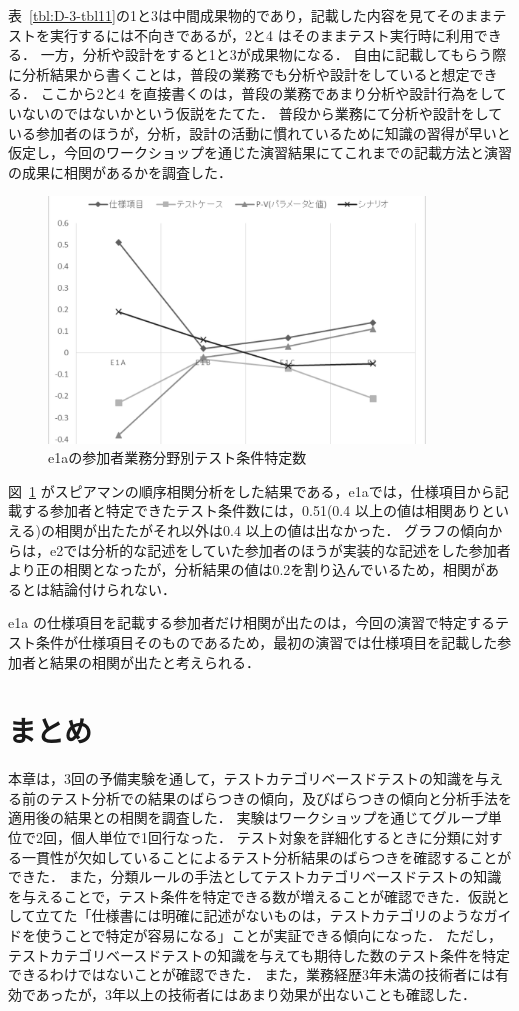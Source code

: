 表~\ref{tbl:D-3-tbl11}の1と3は中間成果物的であり，記載した内容を見てそのままテストを実行するには不向きであるが，2と4 はそのままテスト実行時に利用できる．
一方，分析や設計をすると1と3が成果物になる．
自由に記載してもらう際に分析結果から書くことは，普段の業務でも分析や設計をしていると想定できる．
ここから2と4 を直接書くのは，普段の業務であまり分析や設計行為をしていないのではないかという仮説をたてた．
普段から業務にて分析や設計をしている参加者のほうが，分析，設計の活動に慣れているために知識の習得が早いと仮定し，今回のワークショップを通じた演習結果にてこれまでの記載方法と演習の成果に相関があるかを調査した．

\begin{figure}[h]
  \begin{center}
  \includegraphics[width=10cm]{./image/D-3-Fig13.png}
  \caption{e1aの参加者業務分野別テスト条件特定数}
  \label{fig:D-3-Fig13}
  \end{center}
\end{figure}

図~\ref{fig:D-3-Fig13} がスピアマンの順序相関分析をした結果である，e1aでは，仕様項目から記載する参加者と特定できたテスト条件数には，0.51(0.4 以上の値は相関ありといえる)の相関が出たたがそれ以外は0.4 以上の値は出なかった．
グラフの傾向からは，e2では分析的な記述をしていた参加者のほうが実装的な記述をした参加者より正の相関となったが，分析結果の値は0.2を割り込んでいるため，相関があるとは結論付けられない．

e1a の仕様項目を記載する参加者だけ相関が出たのは，今回の演習で特定するテスト条件が仕様項目そのものであるため，最初の演習では仕様項目を記載した参加者と結果の相関が出たと考えられる．

\newpage
\section{まとめ}
本章は，3回の予備実験を通して，テストカテゴリベースドテストの知識を与える前のテスト分析での結果のばらつきの傾向，及びばらつきの傾向と分析手法を適用後の結果との相関を調査した．
実験はワークショップを通じてグループ単位で2回，個人単位で1回行なった．
テスト対象を詳細化するときに分類に対する一貫性が欠如していることによるテスト分析結果のばらつきを確認することができた．
また，分類ルールの手法としてテストカテゴリベースドテストの知識を与えることで，テスト条件を特定できる数が増えることが確認できた．仮説として立てた「仕様書には明確に記述がないものは，テストカテゴリのようなガイドを使うことで特定が容易になる」ことが実証できる傾向になった．
ただし，テストカテゴリベースドテストの知識を与えても期待した数のテスト条件を特定できるわけではないことが確認できた．
また，業務経歴3年未満の技術者には有効であったが，3年以上の技術者にはあまり効果が出ないことも確認した．
